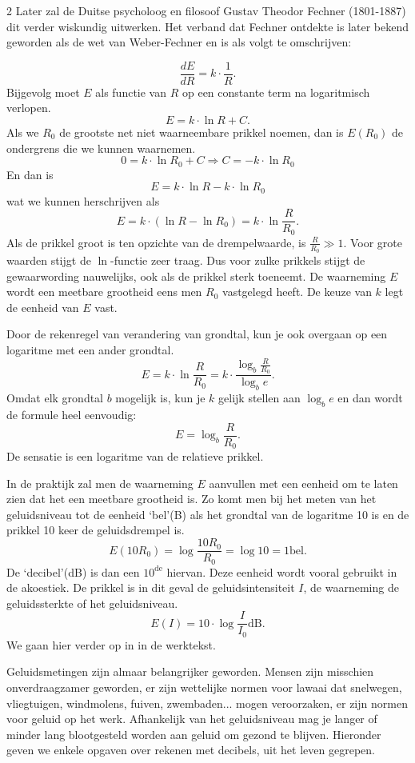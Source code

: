 \begin{multicols}{2}
Later zal de Duitse psycholoog en filosoof Gustav Theodor Fechner (1801-1887) dit verder wiskundig uitwerken. Het verband dat Fechner ontdekte is later bekend geworden als de wet van Weber-Fechner en is als volgt te omschrijven:

\[\frac{d E}{d R}= k \cdot\frac{1}{R}.\]
Bijgevolg moet $E$ als functie van $R$ op een constante term na logaritmisch verlopen.
\[E=k\cdot \ln R+C.\]
Als we  $R_0$ de grootste net niet waarneembare prikkel noemen, dan is $E(R_0)$ de ondergrens die we kunnen waarnemen.
\[0=k\cdot \ln R_0+C\Rightarrow C=-k \cdot \ln R_0\]
En dan is 
\[E=k\cdot \ln R -k \cdot \ln R_0\]
wat we kunnen herschrijven als
\[E=k\cdot (\ln R - \ln R_0)=k\cdot\ln \frac{R}{R_0}.\]
Als de prikkel groot is ten opzichte van de drempelwaarde, is $\frac{R}{R_0}\gg1.$
Voor grote waarden stijgt de $\ln $-functie zeer traag. Dus voor zulke prikkels stijgt de gewaarwording nauwelijks, ook als de prikkel sterk toeneemt.
De waarneming $E$ wordt een meetbare grootheid eens men $R_0$ vastgelegd heeft. De keuze van $k$ legt de eenheid van $E$ vast.

Door de rekenregel van verandering van grondtal, kun je ook overgaan op een logaritme met een ander grondtal.
\[E=k\cdot\ln \frac{R}{R_0}=k\cdot\frac{\log_b \frac{R}{R_0}}{\log_b e}.\]
Omdat elk grondtal $b$ mogelijk is, kun je $k$ gelijk stellen aan $\log_b e$ en dan wordt de formule heel eenvoudig:
\[E=\log_b \frac{R}{R_0}.\]
De sensatie is een logaritme van de relatieve prikkel.



In de praktijk zal men de waarneming $E$ aanvullen met een eenheid om te laten zien dat het een meetbare grootheid is. Zo komt men bij het meten van het geluidsniveau tot de eenheid `bel'(B) als het grondtal van de logaritme 10 is en de prikkel 10 keer de geluidsdrempel is.
\[E(10R_0)=\log \frac{10R_0}{R_0}=\log 10=1 \textrm{bel}.\]
De `decibel'(dB) is dan een $ 10^{\textrm{de}}$ hiervan.
Deze eenheid wordt vooral gebruikt in de akoestiek. De prikkel is in dit geval de geluidsintensiteit $I$, de waarneming de geluidssterkte of het geluidsniveau.
\[E(I)=10\cdot\log \frac{I}{I_0}\textrm{dB}.\]
We gaan hier verder op in in de werktekst.

Geluidsmetingen zijn almaar belangrijker geworden. Mensen zijn misschien onverdraagzamer geworden, er zijn wettelijke normen voor lawaai dat snelwegen, vliegtuigen, windmolens, fuiven, zwembaden... mogen veroorzaken, er zijn normen voor geluid op het werk. Afhankelijk van het geluidsniveau mag je langer of minder lang blootgesteld worden aan geluid om gezond te blijven.
Hieronder geven we enkele opgaven over rekenen met decibels, uit het leven gegrepen.


\end{multicols}
